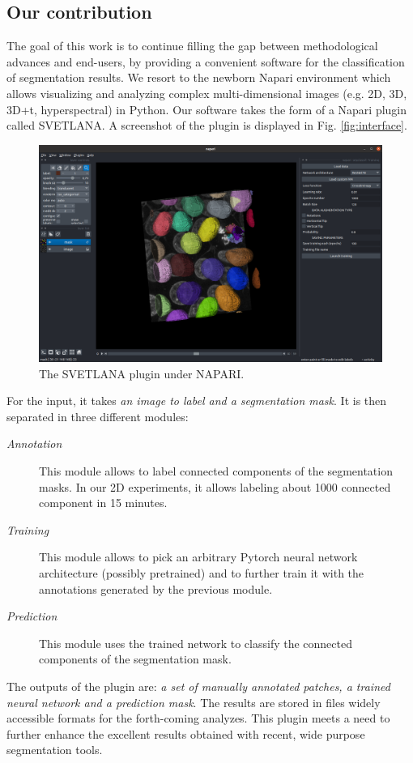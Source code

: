 \documentclass{article}
\begin{document}
\subsection{Our contribution}

The goal of this work is to continue filling the gap between methodological advances and end-users, by providing a convenient software for the classification of segmentation results. 
We resort to the newborn Napari environment \cite{perkel2021python} which allows visualizing and analyzing complex multi-dimensional images (e.g. 2D, 3D, 3D+t, hyperspectral) in Python.
Our software takes the form of a Napari plugin called SVETLANA. A screenshot of the plugin is displayed in Fig. \ref{fig:interface}.

\begin{figure}[htp!]
 \centering
 \includegraphics[width=\linewidth]{Figures/interface.png}
  \caption{The SVETLANA plugin under NAPARI. \label{fig:interface}}
  \label{labelization}
\end{figure}

For the input, it takes \emph{an image to label and a segmentation mask}. It is then separated in three different modules: 
\begin{description}
  \item[\emph{Annotation}] This module allows to label connected components of the segmentation masks. In our 2D experiments, it allows labeling about 1000 connected component in 15 minutes.
  \item[\emph{Training}] This module allows to pick an arbitrary Pytorch \cite{paszke2019pytorch} neural network architecture (possibly pretrained) and to further train it with the annotations generated by the previous module.
  \item[\emph{Prediction}] This module uses the trained network to classify the connected components of the segmentation mask.
\end{description}
The outputs of the plugin are: \emph{a set of manually annotated patches, a trained neural network and a prediction mask}. 
The results are stored in files widely accessible formats for the forth-coming analyzes. This plugin meets a need to further enhance the excellent results obtained with recent, wide purpose segmentation tools.
\end{document}
